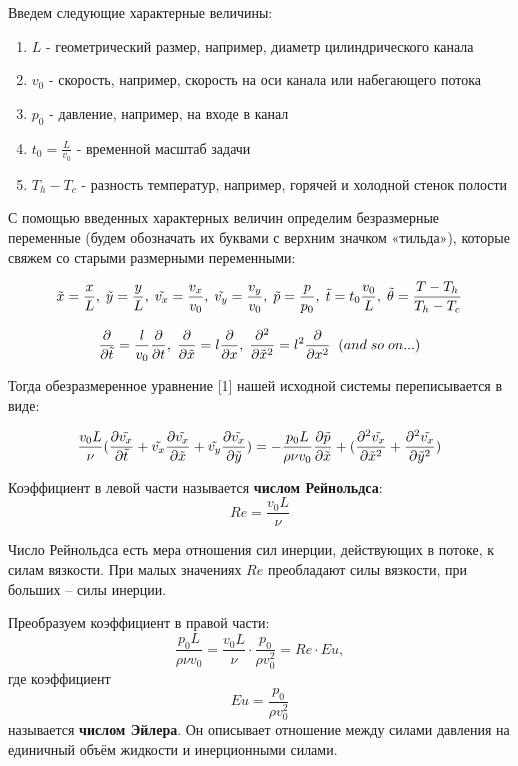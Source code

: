 \bigskip
Введем следующие характерные величины:
\begin{enumerate}
  \item[\textbullet] $L$ - геометрический размер, например, диаметр цилиндрического канала
  \item[\textbullet] $v_0$ - скорость, например, скорость на оси канала или набегающего потока
  \item[\textbullet] $p_0$ - давление, например, на входе в канал
  \item[\textbullet] $t_0 = \frac{L}{v_0}$ - временной масштаб задачи
  \item[\textbullet] $T_h - T_c$ -  разность температур, например, горячей и холодной стенок полости
\end{enumerate}

С помощью введенных характерных величин определим безразмерные переменные (будем обозначать их буквами с верхним значком «тильда»), которые свяжем со старыми размерными переменными:

$$\Tilde{x} = \frac{x}{L},\; \Tilde{y} = \frac{y}{L},\; \Tilde{v_x} = \frac{v_x}{v_0},\; \Tilde{v_y} = \frac{v_y}{v_0},\; \Tilde{p} = \frac{p}{p_0},\; \Tilde{t} = t_0\frac{v_0}{L},\; \Tilde{\theta} = \frac{T - T_h}{T_h - T_c}$$

$$\frac{\partial}{\partial \Tilde{t}} = \frac{l}{v_0} \frac{\partial}{\partial t},\; \frac{\partial}{\partial \Tilde{x}} = l \frac{\partial}{\partial x},\; \frac{\partial^2}{\partial \Tilde{x}^2} = l^2 \frac{\partial}{\partial x^2}\;\; (and\; so\; on...)$$

Тогда обезразмеренное уравнение [1] нашей исходной системы переписывается в виде:

$$\frac{v_0L}{\nu} (\frac{\partial \Tilde{v_x}}{\partial \Tilde{t}} + \Tilde{v_x}\frac{\partial \Tilde{v_x}}{\partial \Tilde{x}} + \Tilde{v_y}\frac{\partial \Tilde{v_x}}{\partial \Tilde{y}}) = -\frac{p_0L}{\rho \nu v_0} \frac{\partial \Tilde{p}}{\partial \Tilde{x}} + (\frac{\partial^2 \Tilde{v_x}}{\partial \Tilde{x}^2} + \frac{\partial^2 \Tilde{v_x}}{\partial \Tilde{y}^2})$$

Коэффициент в левой части называется \textbf{числом Рейнольдса}:
$$Re = \frac{v_0L}{\nu}$$

Число Рейнольдса есть мера отношения сил инерции, действующих в потоке, к силам вязкости. При малых значениях $Re$ преобладают силы вязкости, при больших – силы инерции.

\bigskip
Преобразуем коэффициент в правой части:
$$\frac{p_0L}{\rho \nu v_0} = \frac{v_0L}{\nu} \cdot \frac{p_0}{\rho v_0^2} = Re \cdot Eu,$$
где коэффициент $$Eu = \frac{p_0}{\rho v_0^2}$$
называется \textbf{числом Эйлера}. Он описывает отношение между силами давления на единичный объём жидкости и инерционными силами.

